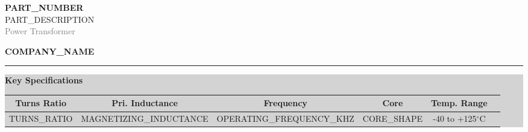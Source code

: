 \documentclass[10pt,a4paper]{article}
\begin{document}
\noindent
\begin{minipage}[t]{0.7\textwidth}
    {\Huge\bfseries\textcolor{headerblue}{{{PART_NUMBER}}}} \\[4mm]
    {\Large {{PART_DESCRIPTION}}} \\[2mm]
    {\large\textcolor{gray}{Power Transformer}}
\end{minipage}
\hfill
\begin{minipage}[t]{0.25\textwidth}
    \raggedleft
    {\large\bfseries\textcolor{headerblue}{{{COMPANY_NAME}}}}
\end{minipage}

\vspace{3mm}
\noindent\rule{\textwidth}{1.5pt}
\vspace{5mm}

\noindent
\colorbox{lightgray}{
\begin{minipage}[t]{0.98\textwidth}
\vspace{2mm}
\centering
{\large\bfseries Key Specifications}
\vspace{2mm}

\begin{tabular}{cccccc}
\textbf{Turns Ratio} & \textbf{Pri. Inductance} & \textbf{Frequency} & \textbf{Core} & \textbf{Temp. Range} \\
\midrule
{{TURNS_RATIO}} & {{MAGNETIZING_INDUCTANCE}} & {{OPERATING_FREQUENCY_KHZ}} & {{CORE_SHAPE}} & -40 to +125$^\circ$C \\
\end{tabular}
\vspace{2mm}
\end{minipage}
}

\vspace{8mm}
\end{document}
